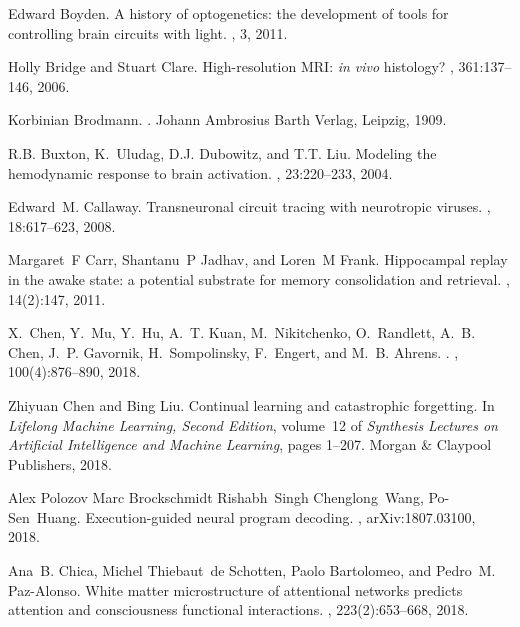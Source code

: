 \documentclass[letterpaper,11pt]{article}
\begin{document}
\begin{thebibliography}{100}
Edward Boyden.
\newblock A history of optogenetics: the development of tools for controlling
  brain circuits with light.
, 3, 2011.

Holly Bridge and Stuart Clare.
\newblock High-resolution {MRI}: {\em{in vivo}} histology?
, 361:137--146, 2006.

Korbinian Brodmann.
.
\newblock Johann Ambrosius Barth Verlag, Leipzig, 1909.

R.B. Buxton, K.~Uludag, D.J. Dubowitz, and T.T. Liu.
\newblock Modeling the hemodynamic response to brain activation.
, 23:220--233, 2004.

Edward~M. Callaway.
\newblock Transneuronal circuit tracing with neurotropic viruses.
, 18:617--623, 2008.

Margaret~F Carr, Shantanu~P Jadhav, and Loren~M Frank.
\newblock Hippocampal replay in the awake state: a potential substrate for
  memory consolidation and retrieval.
, 14(2):147, 2011.

X.~Chen, Y.~Mu, Y.~Hu, A.~T. Kuan, M.~Nikitchenko, O.~Randlett, A.~B. Chen,
  J.~P. Gavornik, H.~Sompolinsky, F.~Engert, and M.~B. Ahrens.
.
, 100(4):876--890, 2018.

Zhiyuan Chen and Bing Liu.
\newblock Continual learning and catastrophic forgetting.
\newblock In {\em Lifelong Machine Learning, Second Edition}, volume~12 of {\em
  Synthesis Lectures on Artificial Intelligence and Machine Learning}, pages
  1--207. Morgan \& Claypool Publishers, 2018.

Alex Polozov Marc Brockschmidt Rishabh~Singh Chenglong~Wang, Po-Sen~Huang.
\newblock Execution-guided neural program decoding.
, arXiv:1807.03100, 2018.

Ana~B. Chica, Michel Thiebaut~de Schotten, Paolo Bartolomeo, and Pedro~M.
  Paz-Alonso.
\newblock White matter microstructure of attentional networks predicts
  attention and consciousness functional interactions.
, 223(2):653--668, 2018.


\end{thebibliography}
\end{document}
